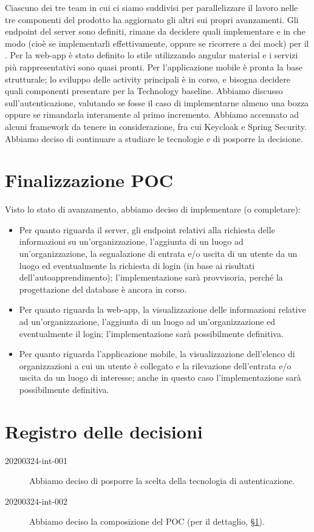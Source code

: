 \documentclass{article}
\begin{document}
Ciascuno dei tre team in cui ci siamo suddivisi per parallelizzare il lavoro nelle tre componenti del prodotto ha aggiornato gli altri sui propri avanzamenti.
Gli endpoint del server sono definiti, rimane da decidere quali implementare e in che modo (cioè se implementarli effettivamente, oppure se ricorrere a dei mock) per il \@.
Per la web-app è stato definito lo stile utilizzando angular material e i servizi più rappresentativi sono quasi pronti.
Per l'applicazione mobile è pronta la base strutturale; lo sviluppo delle activity principali è in corso, e bisogna decidere quali componenti presentare per la Technology baseline.
Abbiamo discusso sull'autenticazione, valutando se fosse il caso di implementarne almeno una bozza oppure se rimandarla interamente al primo incremento.
Abbiamo accennato ad alcuni framework da tenere in considerazione, fra cui Keycloak e Spring Security.
Abbiamo deciso di continuare a studiare le tecnologie e di posporre la decisione.

\section{Finalizzazione POC}%
\label{sec:finalizzazione_poc}

Visto lo stato di avanzamento, abbiamo deciso di implementare (o completare):
\begin{itemize}
  \item Per quanto riguarda il server, gli endpoint relativi alla richiesta delle informazioni su un'organizzazione, l'aggiunta di un luogo ad un'organizzazione, la segnalazione di entrata e/o uscita di un utente da un luogo ed eventualmente la richiesta di login (in base ai risultati dell'autoapprendimento); l'implementazione sarà provvisoria, perché la progettazione del database è ancora in corso.
  \item Per quanto riguarda la web-app, la visualizzazione delle informazioni relative ad un'organizzazione, l'aggiunta di un luogo ad un'organizzazione ed eventualmente il login; l'implementazione sarà possibilmente definitiva.
  \item Per quanto riguarda l'applicazione mobile, la visualizzazione dell'elenco di organizzazioni a cui un utente è collegato e la rilevazione dell'entrata e/o uscita da un luogo di interesse; anche in questo caso l'implementazione sarà possibilmente definitiva.
\end{itemize}

\newpage
\section{Registro delle decisioni}%
\label{sec:registro_delle_decisioni}

\begin{description}
  \item[20200324-int-001] Abbiamo deciso di posporre la scelta della tecnologia di autenticazione.
  \item[20200324-int-002] Abbiamo deciso la composizione del POC (per il dettaglio, §\ref{sec:finalizzazione_poc}).
\end{description}

\end{document}
